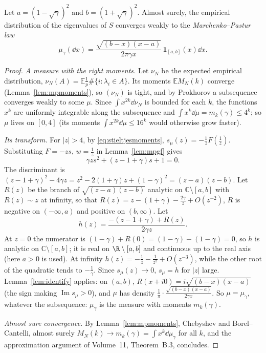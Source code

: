\begin{theorem}\label{thm:mp}
Let $a=(1-\sqrt\gamma)^2$ and $b=(1+\sqrt\gamma)^2$. Almost surely, the empirical distribution of the eigenvalues of $S$ converges weakly to the \emph{Marchenko--Pastur law}
\[
\mu_\gamma(\dd x)=\frac{\sqrt{(b-x)(x-a)}}{2\pi\gamma x}\,\mathbf 1_{[a,b]}(x)\dd x.
\]
\end{theorem}

\begin{proof}
\emph{A measure with the right moments.} Let $\nu_N$ be the expected empirical distribution, $\nu_N(A)=\mathbb E\frac1p\#\{i:\lambda_i\in A\}$. Its moments $\mathbb EM_N(k)$ converge (Lemma~\ref{lem:mpmoments}), so $(\nu_N)$ is tight, and by
Prokhorov a subsequence converges weakly to some $\mu$. Since $\int x^{2k}\dd\nu_N$ is bounded for each $k$, the functions $x^k$ are uniformly integrable along the subsequence and $\int x^k\dd\mu=m_k(\gamma)\le4^k$; so $\mu$
lives on $[0,4]$ (its moments $\int x^{2k}\dd\mu\le16^k$ would otherwise grow faster).

\emph{Its transform.} For $|z|>4$, by \eqref{eq:stieltjesmoments}, $s_\mu(z)=-\frac1zF(\frac1z)$. Substituting $F=-zs$, $w=\frac1z$ in Lemma~\ref{lem:mpgf} gives
\[
\gamma zs^2+(z-1+\gamma)s+1=0.
\]
The discriminant is $(z-1+\gamma)^2-4\gamma z=z^2-2(1+\gamma)z+(1-\gamma)^2=(z-a)(z-b)$. Let $R(z)$ be the branch of $\sqrt{(z-a)(z-b)}$ analytic on $\mathbb C\setminus[a,b]$ with $R(z)\sim z$ at infinity, so that
$R(z)=z-(1+\gamma)-\frac{2\gamma}z+O(z^{-2})$, $R$ is negative on $(-\infty,a)$ and positive on $(b,\infty)$. Let
\[
h(z)=\frac{-(z-1+\gamma)+R(z)}{2\gamma z}.
\]
At $z=0$ the numerator is $(1-\gamma)+R(0)=(1-\gamma)-(1-\gamma)=0$, so $h$ is analytic on $\mathbb C\setminus[a,b]$; it is real on $\R\setminus[a,b]$ and continuous up to the real axis (here $a>0$ is used). At infinity
$h(z)=-\frac1z-\frac1{z^2}+O(z^{-3})$, while the other root of the quadratic tends to $-\frac1\gamma$. Since $s_\mu(z)\to0$, $s_\mu=h$ for $|z|$ large. Lemma~\ref{lem:identify} applies: on $(a,b)$, $R(x+i0)=i\sqrt{(b-x)(x-a)}$
(the sign making $\operatorname{Im}s_\mu>0$), and $\mu$ has density $\frac1\pi\cdot\frac{\sqrt{(b-x)(x-a)}}{2\gamma x}$. So $\mu=\mu_\gamma$, whatever the subsequence: $\mu_\gamma$ is the measure with moments $m_k(\gamma)$.

\emph{Almost sure convergence.} By Lemma~\ref{lem:mpmoments}, Chebyshev and Borel--Cantelli, almost surely $M_N(k)\to m_k(\gamma)=\int x^k\dd\mu_\gamma$ for all $k$, and the approximation argument of Volume~11, Theorem~B.3, concludes.
\end{proof}

